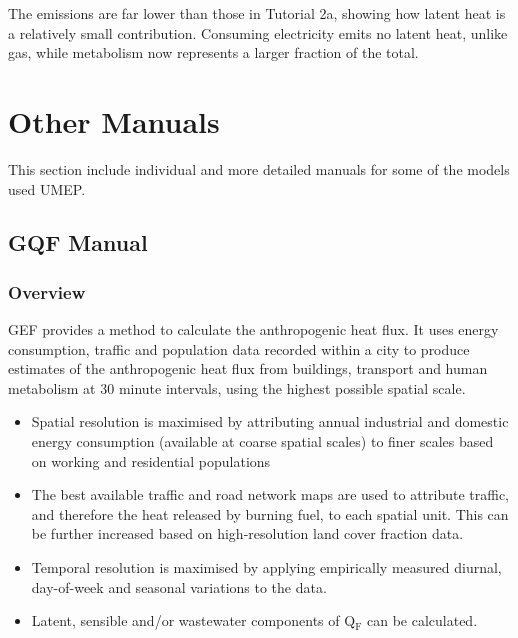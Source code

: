 \documentclass[letterpaper,10pt,english]{sphinxmanual}
\begin{document}
The emissions are far lower than those in Tutorial 2a, showing how
latent heat is a relatively small contribution. Consuming electricity
emits no latent heat, unlike gas, while metabolism now represents a
larger fraction of the total.


\chapter{Other Manuals}
\label{\detokenize{OtherManuals/OtherManuals:other-manuals}}\label{\detokenize{OtherManuals/OtherManuals:othermanuals}}\label{\detokenize{OtherManuals/OtherManuals::doc}}
This section include individual and more detailed manuals for some of the models used UMEP.


\section{GQF Manual}
\label{\detokenize{OtherManuals/GQF_Manual:gqf-manual}}\label{\detokenize{OtherManuals/GQF_Manual::doc}}

\subsection{Overview}
\label{\detokenize{OtherManuals/GQF_Manual:overview}}
GEF provides a method to calculate the anthropogenic heat flux. It uses
energy consumption, traffic and population data recorded within a city
to produce estimates of the anthropogenic heat flux from buildings,
transport and human metabolism at 30 minute intervals, using the highest
possible spatial scale.
\begin{itemize}
\item {} 
Spatial resolution is maximised by attributing annual industrial and
domestic energy consumption (available at coarse spatial scales) to
finer scales based on working and residential populations

\item {} 
The best available traffic and road network maps are used to
attribute traffic, and therefore the heat released by burning fuel,
to each spatial unit. This can be further increased based on
high-resolution land cover fraction data.

\item {} 
Temporal resolution is maximised by applying empirically measured
diurnal, day-of-week and seasonal variations to the data.

\item {} 
Latent, sensible and/or wastewater components of Q$_{\text{F}}$ can be
calculated.

\end{itemize}
\end{document}
